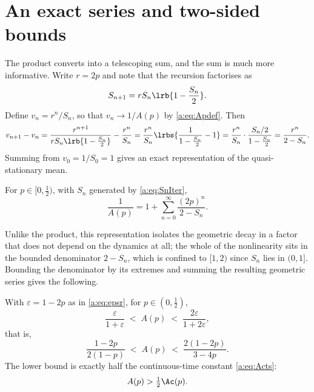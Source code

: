 \section{An exact series and two-sided bounds}
\label{a:sec:series}

The product converts into a telescoping sum, and the sum is much more informative.
Write $r=2p$ and note that the recursion factorises as
\begin{equation*}
S_{n+1} = rS_n\lrb{1-\frac{S_n}{2}} .
\end{equation*}
Define $v_n = r^n/S_n$, so that $v_n\to1/A(p)$ by \cref{a:eq:Apdef}. Then
\begin{equation}
\label{a:eq:vincrement}
v_{n+1}-v_n
= \frac{r^{n+1}}{rS_n\lrb{1-\frac{S_n}{2}}} - \frac{r^n}{S_n}
= \frac{r^n}{S_n}\lrbs{\frac{1}{1-\frac{S_n}{2}}-1}
= \frac{r^n}{S_n}\cdot\frac{S_n/2}{1-\frac{S_n}{2}}
= \frac{r^n}{2-S_n} .
\end{equation}
Summing from $v_0 = 1/S_0 = 1$ gives an exact representation of the
quasi-stationary mean.

\begin{proposition}
\label{a:prop:series}
For $p\in[0,\tfrac12)$, with $S_n$ generated by \cref{a:eq:SnIter},
\begin{equation}
\label{a:eq:Aseries}
\frac{1}{A(p)} = 1 + \sum_{n=0}^{\infty}\frac{(2p)^n}{2-S_n} .
\end{equation}
\end{proposition}

\noindent
Unlike the product, this representation isolates the geometric decay in a factor
that does not depend on the dynamics at all; the whole of the nonlinearity sits in
the bounded denominator $2-S_n$, which is confined to $[1,2)$ since $S_n$ lies in
$(0,1]$. Bounding the denominator by
its extremes and summing the resulting geometric series gives the following.

\begin{proposition}
\label{a:prop:bounds}
With $\varepsilon=1-2p$ as in \cref{a:eq:epsr}, for $p\in(0,\tfrac12)$,
\begin{equation}
\label{a:eq:Abounds}
\frac{\varepsilon}{1+\varepsilon} \;<\; A(p) \;<\; \frac{2\varepsilon}{1+2\varepsilon},
\end{equation}
that is,
\begin{equation}
\label{a:eq:Aboundsexplicit}
\frac{1-2p}{2(1-p)} \;<\; A(p) \;<\; \frac{2(1-2p)}{3-4p}.
\end{equation}
The lower bound is exactly half the continuous-time constant \cref{a:eq:Acts}:
\begin{equation}
\label{a:eq:halfAc}
A(p) > \tfrac12\Ac(p) .
\end{equation}
\end{proposition}


